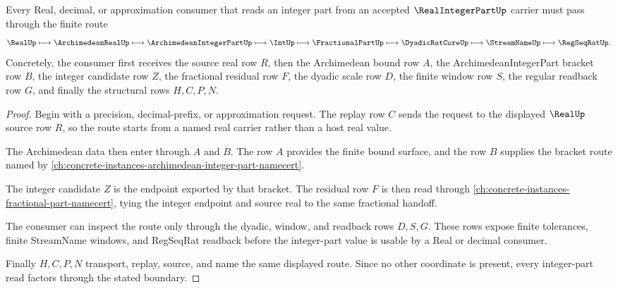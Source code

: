 \begin{theorem}
\label{thm:real-integer-part-bracket-route}
Every Real, decimal, or approximation consumer that reads an integer part from an accepted $\RealIntegerPartUp$ carrier must pass through the finite route
$$
\RealUp \longmapsto \ArchimedeanRealUp \longmapsto \ArchimedeanIntegerPartUp \longmapsto \IntUp \longmapsto \FractionalPartUp \longmapsto \DyadicRatCoreUp \longmapsto \StreamNameUp \longmapsto \RegSeqRatUp .
$$
Concretely, the consumer first receives the source real row $R$, then the Archimedean bound row $A$, the ArchimedeanIntegerPart bracket row $B$, the integer candidate row $Z$, the fractional residual row $F$, the dyadic scale row $D$, the finite window row $S$, the regular readback row $G$, and finally the structural rows $H,C,P,N$.
\end{theorem}
\begin{proof}
Begin with a precision, decimal-prefix, or approximation request. The replay row $C$ sends the request to the displayed $\RealUp$ source row $R$, so the route starts from a named real carrier rather than a host real value.

The Archimedean data then enter through $A$ and $B$. The row $A$ provides the finite bound surface, and the row $B$ supplies the bracket route named by \autoref{ch:concrete-instances-archimedean-integer-part-namecert}.

The integer candidate $Z$ is the endpoint exported by that bracket. The residual row $F$ is then read through \autoref{ch:concrete-instances-fractional-part-namecert}, tying the integer endpoint and source real to the same fractional handoff.

The consumer can inspect the route only through the dyadic, window, and readback rows $D,S,G$. These rows expose finite tolerances, finite StreamName windows, and RegSeqRat readback before the integer-part value is usable by a Real or decimal consumer.

Finally $H,C,P,N$ transport, replay, source, and name the same displayed route. Since no other coordinate is present, every integer-part read factors through the stated boundary.
\end{proof}



